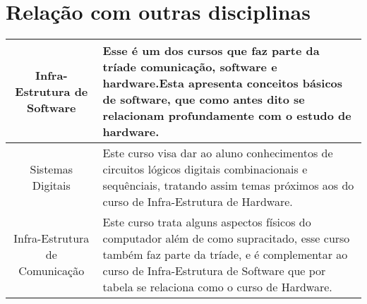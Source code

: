 \documentclass{article}
\begin{document}
\section{Relação com outras disciplinas}
\begin{center}
\begin{tabular}{ |c|m{25em}| } 
 \hline
Infra-Estrutura de Software & Esse é um dos cursos que faz parte da tríade comunicação, software e hardware.Esta apresenta conceitos básicos de software, que como antes dito se relacionam profundamente com o estudo de hardware.\citep{ref3} \\ 
\hline
 Sistemas  Digitais  &  Este curso visa dar ao aluno conhecimentos de circuitos lógicos digitais combinacionais e sequênciais, tratando assim temas próximos aos do curso de Infra-Estrutura de Hardware.\citep{ref3} \\ 
\hline
Infra-Estrutura de Comunicação & Este curso trata alguns aspectos físicos do computador além de como  supracitado, esse curso também faz parte da tríade, e é complementar ao curso de Infra-Estrutura de Software que por tabela se relaciona como o curso de Hardware. \citep{ref4}\\ 
 \hline
\end{tabular}
\end{center}




\end{document}

